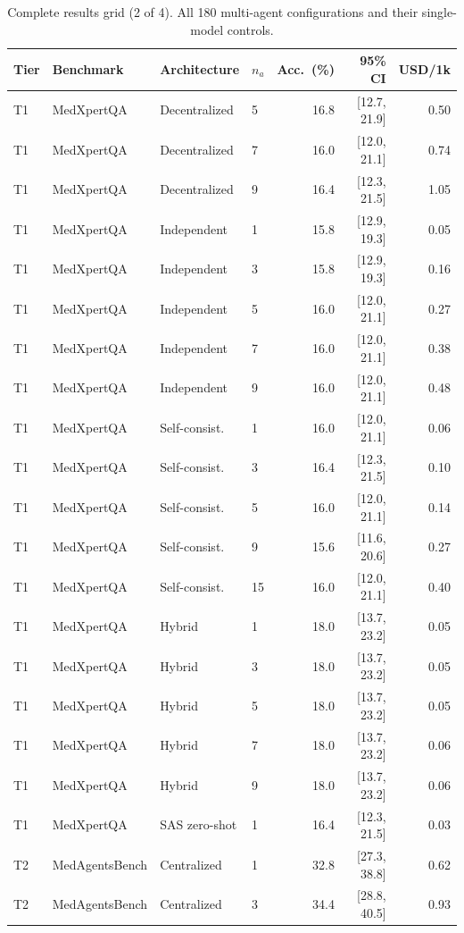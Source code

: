 \begin{table}[t]\centering\scriptsize
\caption{Complete results grid (2 of 4). All 180 multi-agent configurations and their single-model controls.}
\begin{tabular}{@{}llllrrr@{}}
\toprule
Tier & Benchmark & Architecture & $n_a$ & Acc.\ (\%) & 95\% CI & USD/1k \\
\midrule
T1 & MedXpertQA & Decentralized & 5 & 16.8 & [12.7, 21.9] & 0.50 \\
T1 & MedXpertQA & Decentralized & 7 & 16.0 & [12.0, 21.1] & 0.74 \\
T1 & MedXpertQA & Decentralized & 9 & 16.4 & [12.3, 21.5] & 1.05 \\
T1 & MedXpertQA & Independent & 1 & 15.8 & [12.9, 19.3] & 0.05 \\
T1 & MedXpertQA & Independent & 3 & 15.8 & [12.9, 19.3] & 0.16 \\
T1 & MedXpertQA & Independent & 5 & 16.0 & [12.0, 21.1] & 0.27 \\
T1 & MedXpertQA & Independent & 7 & 16.0 & [12.0, 21.1] & 0.38 \\
T1 & MedXpertQA & Independent & 9 & 16.0 & [12.0, 21.1] & 0.48 \\
T1 & MedXpertQA & Self-consist. & 1 & 16.0 & [12.0, 21.1] & 0.06 \\
T1 & MedXpertQA & Self-consist. & 3 & 16.4 & [12.3, 21.5] & 0.10 \\
T1 & MedXpertQA & Self-consist. & 5 & 16.0 & [12.0, 21.1] & 0.14 \\
T1 & MedXpertQA & Self-consist. & 9 & 15.6 & [11.6, 20.6] & 0.27 \\
T1 & MedXpertQA & Self-consist. & 15 & 16.0 & [12.0, 21.1] & 0.40 \\
T1 & MedXpertQA & Hybrid & 1 & 18.0 & [13.7, 23.2] & 0.05 \\
T1 & MedXpertQA & Hybrid & 3 & 18.0 & [13.7, 23.2] & 0.05 \\
T1 & MedXpertQA & Hybrid & 5 & 18.0 & [13.7, 23.2] & 0.05 \\
T1 & MedXpertQA & Hybrid & 7 & 18.0 & [13.7, 23.2] & 0.06 \\
T1 & MedXpertQA & Hybrid & 9 & 18.0 & [13.7, 23.2] & 0.06 \\
T1 & MedXpertQA & SAS zero-shot & 1 & 16.4 & [12.3, 21.5] & 0.03 \\
T2 & MedAgentsBench & Centralized & 1 & 32.8 & [27.3, 38.8] & 0.62 \\
T2 & MedAgentsBench & Centralized & 3 & 34.4 & [28.8, 40.5] & 0.93 \\

\end{tabular}
\end{table}
